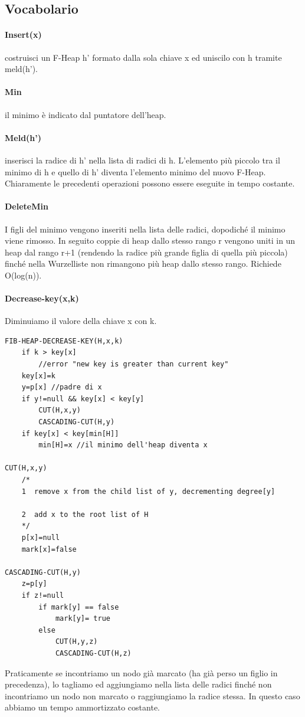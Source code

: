 \documentclass[a4paper]{book}
\begin{document}
\subsection*{Vocabolario}
\paragraph*{Insert(x)} costruisci un F-Heap h' formato dalla sola chiave x ed uniscilo con h tramite meld(h').
\paragraph*{Min} il minimo è indicato dal puntatore dell'heap.
\paragraph*{Meld(h')} inserisci la radice di h' nella lista di radici di h. L'elemento più piccolo tra il minimo di h e quello di h' diventa l'elemento minimo del nuovo F-Heap.
Chiaramente le precedenti operazioni possono essere eseguite in tempo costante. 
\paragraph*{DeleteMin} I figli del minimo vengono inseriti nella lista delle radici, dopodiché il minimo viene rimosso. In seguito coppie di heap dallo stesso rango r vengono uniti in un heap dal rango r+1 (rendendo la radice più grande figlia di quella più piccola) finché nella Wurzelliste non rimangono più heap dallo stesso rango. Richiede O(log(n)).
\paragraph*{Decrease-key(x,k)} Diminuiamo il valore della chiave x con k.
\begin{lstlisting}
FIB-HEAP-DECREASE-KEY(H,x,k) 
	if k > key[x]
		//error "new key is greater than current key"
	key[x]=k
	y=p[x] //padre di x
	if y!=null && key[x] < key[y]
		CUT(H,x,y)
		CASCADING-CUT(H,y)
	if key[x] < key[min[H]]
		min[H]=x //il minimo dell'heap diventa x

CUT(H,x,y)
	/*
	1  remove x from the child list of y, decrementing degree[y]

	2  add x to the root list of H
	*/
	p[x]=null
	mark[x]=false

CASCADING-CUT(H,y)
	z=p[y]
	if z!=null
		if mark[y] == false
			mark[y]= true
		else 
			CUT(H,y,z)
			CASCADING-CUT(H,z)
\end{lstlisting}
Praticamente se incontriamo un nodo già marcato (ha già perso un figlio in precedenza), lo tagliamo ed aggiungiamo nella lista delle radici finché non incontriamo un nodo non marcato o raggiungiamo la radice stessa. In questo caso abbiamo un tempo ammortizzato costante.
\end{document}
